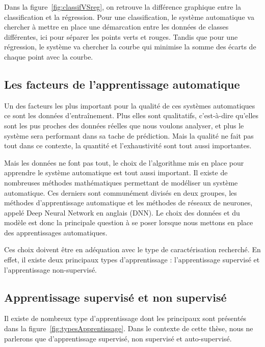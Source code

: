 

Dans la figure~\ref{fig:classifVSreg}, on retrouve la différence graphique entre la classification et la régression. Pour une classification, le système automatique va chercher à mettre en place une démarcation entre les données de classes différentes, ici pour séparer les points verts et rouges. Tandis que pour une régression, le système va chercher la courbe qui minimise la somme des écarts de chaque point avec la courbe.

\subsection{Les facteurs de l'apprentissage automatique}
Un des facteurs les plus important pour la qualité de ces systèmes automatiques ce sont les données d’entraînement. Plus elles sont qualitatifs, c'est-à-dire qu'elles sont les pus proches des données réelles que nous voulons analyser, et plus le système sera performant dans sa tache de prédiction. Mais la qualité ne fait pas tout dans ce contexte, la quantité et l'exhaustivité sont tout aussi importantes.

Mais les données ne font pas tout, le choix de l'algorithme mis en place pour apprendre le système automatique est tout aussi important. Il existe de nombreuses méthodes mathématiques permettant de modéliser un système automatique. Ces derniers sont communément divisés en deux groupes, les méthodes d'apprentissage automatique et les méthodes de réseaux de neurones, appelé Deep Neural Network en anglais (DNN).
Le choix des données et du modèle est donc la principale question à se poser lorsque nous mettons en place des apprentissages automatiques.

Ces choix doivent être en adéquation avec le type de caractérisation recherché. En effet, il existe deux principaux types d'apprentissage : l'apprentissage supervisé et l'apprentissage non-supervisé.

\subsection{Apprentissage supervisé et non supervisé}


Il existe de nombreux type d'apprentissage dont les principaux sont présentés dans la figure~\ref{fig:typesApprentissage}. Dans le contexte de cette thèse, nous ne parlerons que d'apprentissage supervisé, non supervisé et auto-supervisé.

